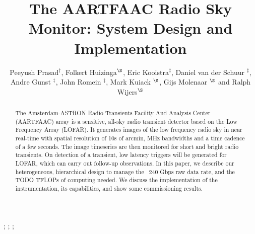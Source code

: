 \documentclass{ws-jai}
\begin{document}
\catchline{}{}{}{}{} %


\title{The AARTFAAC Radio Sky Monitor: System Design and Implementation}

\author{Peeyush Prasad$^\dagger$, Folkert Huizinga$^\S$, Eric Kooistra$^\ddagger$, Daniel van der Schuur $^\ddagger$, Andre Gunst $^\ddagger$, John Romein $^\ddagger$, Mark Kuiack $^\S$, Gijs Molenaar $^\S$ and Ralph Wijers$^\S$}

\address{
$^\dagger$Anton Pannekoek Institute, University of Amsterdam, Amsterdam, The Netherlands, p.prasad@uva.nl\\
$^\ddagger$ASTRON, Oude Hoogeveensedijk, 7991PD, The Netherlands\\
$^\S$Anton Pannekoek Institute, University of Amsterdam, Amsterdam\\
}

\maketitle


\begin{history}
;
;
;
\end{history}

\begin{abstract}
The Amsterdam-ASTRON  Radio Transients  Facility And Analysis  Center (AARTFAAC)
array  is  a sensitive,  all-sky  radio  transient  detector  based on  the  Low
Frequency Array (LOFAR).  It generates images  of the low frequency radio sky in
near real-time  with spatial resolution of  10s of arcmin, MHz  bandwidths and a
time cadence of a few seconds. The image timeseries are then monitored for short
and bright radio  transients. On detection of a transient,  low latency triggers
will be  generated for LOFAR,  which can  carry out follow-up  observations.  In
this paper,  we describe  our heterogeneous, hierarchical  design to  manage the
~240 Gbps raw data rate, and the TODO TFLOPs of computing needed.  We discuss the
implementation  of   the  instrumentation,  its  capabilities,   and  show  some
commissioning results.
\end{abstract}

\end{document}
